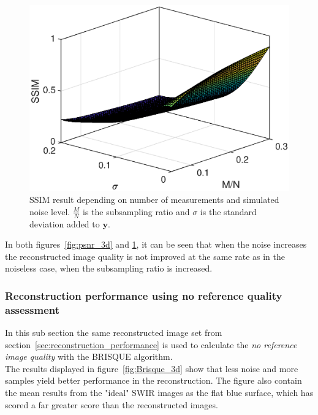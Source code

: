 \begin{figure}[H]
    \centering
    \includegraphics[width = 0.7\linewidth]{result/synt_sss/SSIM_fit.eps}
    \caption{SSIM result depending on number of measurements and simulated noise level. $\frac{M}{N}$ is the subsampling ratio and $\sigma$ is the standard deviation added to $\mathbf{y}$.}
    \label{fig:ssim_3d}
\end{figure}

In both figures~\ref{fig:psnr_3d} and \ref{fig:ssim_3d}, it can be seen that when the noise increases the reconstructed image quality is not improved at the same rate as in the noiseless case, when the subsampling ratio is increased.

\subsubsection{Reconstruction performance using no reference quality assessment}
In this sub section the same reconstructed image set from section~\ref{sec:reconstruction_performance} is used to calculate the \textit{no reference image quality} with the BRISQUE algorithm.\\[0.1in] 

The results displayed in figure~\ref{fig:Brisque_3d} show that less noise and more samples yield better performance in the reconstruction. The figure also contain the mean results from the "ideal" SWIR images as the flat blue surface, which has scored a far greater score than the reconstructed images.
  

